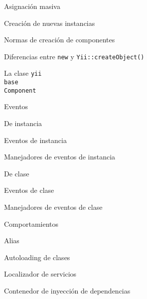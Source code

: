 \begin{longenum}
\begin{longenum}
\begin{longenum}
\begin{longenum}
\begin{longenum}
                    \begin{longenum}
                        \item Asignación masiva
                        \item Creación de nuevas instancias
                        \item Normas de creación de componentes
                        \item Diferencias entre \texttt{new} y \texttt{Yii::createObject()}
                    \end{longenum}
                \end{longenum}
                \item La clase \texttt{yii\\base\\Component}
                \begin{longenum}
                    \item Eventos
                    \begin{longenum}
                        \item De instancia
                        \begin{longenum}
                            \item Eventos de instancia
                            \item Manejadores de eventos de instancia
                        \end{longenum}
                        \item De clase
                        \begin{longenum}
                            \item Eventos de clase
                            \item Manejadores de eventos de clase
                        \end{longenum}
                    \end{longenum}
                    \item Comportamientos
                \end{longenum}
            \end{longenum}
            \item Alias
            \item Autoloading de clases
            \item Localizador de servicios
            \item Contenedor de inyección de dependencias
        \end{longenum}

\end{longenum}
\end{longenum}
